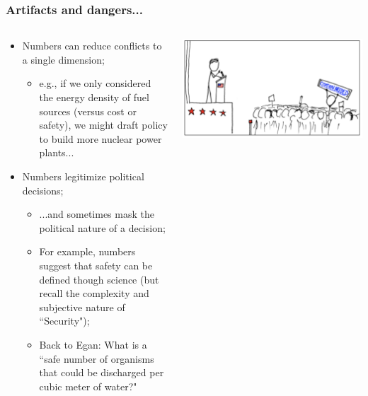 \documentclass[aspectratio=169]{beamer}
\theoremstyle{principle}
\begin{document}
\begin{frame}
\frametitle{Artifacts and dangers...}
\begin{columns}
\begin{column}{0.5\textwidth}

\begin{itemize}
\item Numbers can reduce conflicts to a single dimension;
\begin{itemize}
\item e.g., if we only considered the energy density of fuel sources (versus cost or safety), we might draft policy to build more nuclear power plants...
\end{itemize}
\item Numbers legitimize political decisions;
\begin{itemize}
\item ...and sometimes mask the political nature of a decision;
\item For example, numbers suggest that safety can be defined though science (but recall the complexity and subjective nature of ``Security");
\item Back to Egan: What is a ``safe number of organisms that could be discharged per cubic meter of water?"
\end{itemize}
\end{itemize}

\end{column}
\begin{column}{0.5\textwidth}
\includegraphics[scale=0.4]{speech.png}
\end{column}
\end{columns}

\end{frame}
\end{document}

